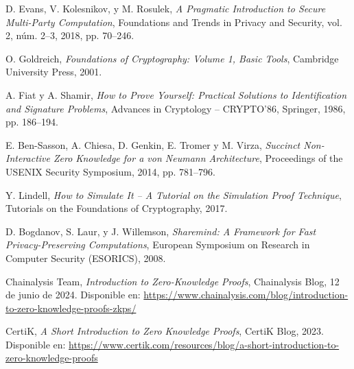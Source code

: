 \documentclass{article}
\begin{document}
\begin{thebibliography}{99}

D. Evans, V. Kolesnikov, y M. Rosulek, 
\textit{A Pragmatic Introduction to Secure Multi-Party Computation}, 
Foundations and Trends in Privacy and Security, vol. 2, núm. 2--3, 2018, pp. 70--246.

O. Goldreich, 
\textit{Foundations of Cryptography: Volume 1, Basic Tools}, 
Cambridge University Press, 2001.

A. Fiat y A. Shamir, 
\textit{How to Prove Yourself: Practical Solutions to Identification and Signature Problems}, 
Advances in Cryptology -- CRYPTO’86, Springer, 1986, pp. 186--194.

E. Ben-Sasson, A. Chiesa, D. Genkin, E. Tromer y M. Virza, 
\textit{Succinct Non-Interactive Zero Knowledge for a von Neumann Architecture}, 
Proceedings of the USENIX Security Symposium, 2014, pp. 781--796.

Y. Lindell, 
\textit{How to Simulate It – A Tutorial on the Simulation Proof Technique}, 
Tutorials on the Foundations of Cryptography, 2017.

D. Bogdanov, S. Laur, y J. Willemson, 
\textit{Sharemind: A Framework for Fast Privacy-Preserving Computations}, 
European Symposium on Research in Computer Security (ESORICS), 2008.

Chainalysis Team, 
\textit{Introduction to Zero-Knowledge Proofs}, 
Chainalysis Blog, 12 de junio de 2024. Disponible en: \url{https://www.chainalysis.com/blog/introduction-to-zero-knowledge-proofs-zkps/}

CertiK, 
\textit{A Short Introduction to Zero Knowledge Proofs}, 
CertiK Blog, 2023. Disponible en: \url{https://www.certik.com/resources/blog/a-short-introduction-to-zero-knowledge-proofs}

\end{thebibliography}
\end{document}
